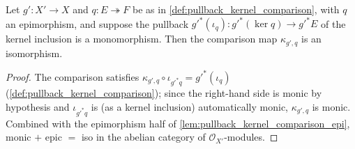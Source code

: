 \begin{lemma}
  \label{lem:pullback_kernel_comparison_iso_of_mono}
  Let \(g' : X' \to X\) and \(q : E \twoheadrightarrow F\) be as in
  \cref{def:pullback_kernel_comparison}, with \(q\) an epimorphism, and
  suppose the pullback \(g'^{*}(\iota_q) : g'^{*}(\ker q) \to g'^{*}E\) of
  the kernel inclusion is a monomorphism. Then the comparison map
  \(\kappa_{g',q}\) is an isomorphism.
\end{lemma}
\begin{proof}\leanok
  The comparison satisfies \(\kappa_{g',q} \circ \iota_{g'^{*}q} =
  g'^{*}(\iota_q)\) (\cref{def:pullback_kernel_comparison}); since the
  right-hand side is monic by hypothesis and \(\iota_{g'^{*}q}\) is (as a
  kernel inclusion) automatically monic, \(\kappa_{g',q}\) is monic.
  Combined with the epimorphism half of
  \cref{lem:pullback_kernel_comparison_epi}, monic \(+\) epic \(=\) iso in
  the abelian category of \(\mathcal O_{X'}\)-modules.
\end{proof}


